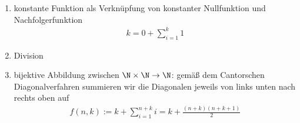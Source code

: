 \begin{solution}
\begin{enumerate}
		\item konstante Funktion als Verknüpfung von konstanter Nullfunktion und Nachfolgerfunktion
			\begin{align*}
			k = 0 + \sum_{i = 1}^k 1
			\end{align*}
		\item Division
		\item bijektive Abbildung zwischen $\N \times \N \to \N$: gemäß dem Cantorschen Diagonalverfahren summieren wir die Diagonalen jeweils von links unten nach rechts oben auf
			\begin{align*}
			f(n,k) := k + \sum_{i = 1}^{n + k} i = k + \frac{(n + k) (n + k + 1)}{2}
			\end{align*}
	\end{enumerate}

\end{solution}

